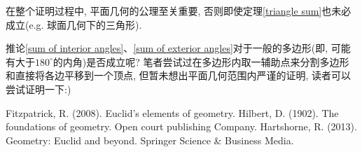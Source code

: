 \documentclass[main]{subfiles}
\begin{document}
{	\begin{remark}
		\textup{在整个证明过程中, 平面几何的公理至关重要, 否则即使定理\ref{triangle sum}也未必成立(e.g. 球面几何下的三角形).}
	\end{remark}
	
	\begin{remark}
		\textup{\small 推论\ref{sum of interior angles}、\ref{sum of exterior angles}对于一般的多边形(即, 可能有大于$180^{\circ}$的内角)是否成立呢? 笔者尝试过在多边形内取一辅助点来分割多边形和直接将各边平移到一个顶点, 但暂未想出平面几何范围内严谨的证明, 读者可以尝试证明一下:)}
	\end{remark}
	
	{\small
		\begin{thebibliography}{9}
			 Fitzpatrick, R. (2008). Euclid's elements of geometry.
			 Hilbert, D. (1902). The foundations of geometry. Open court publishing Company.
			 Hartshorne, R. (2013). Geometry: Euclid and beyond. Springer Science \& Business Media.
		\end{thebibliography}
	}
}
\end{document}
